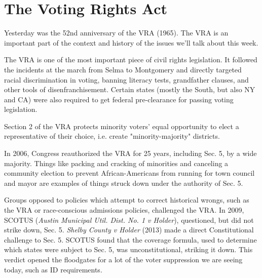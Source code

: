 



\section*{The Voting Rights Act}

Yesterday was the 52nd anniversary of the VRA (1965).  The VRA is an important part of the context and history of the issues we'll talk about this week.

The VRA is one of the most important piece of civil rights legislation.  It followed the incidents at the march from Selma to Montgomery and directly targeted racial discrimination in voting, banning literacy tests, grandfather clauses, and other tools of disenfranchisement.  Certain states (mostly the South, but also NY and CA) were also required to get federal pre-clearance for passing voting legislation.

Section 2 of the VRA protects minority voters' equal opportunity to elect a representative of their choice, i.e. create "minority-majority" districts.

In 2006, Congress reauthorized the VRA for 25 years, including Sec. 5, by a wide majority.  Things like packing and cracking of minorities and canceling a community election to prevent African-Americans from running for town council and mayor are examples of things struck down under the authority of Sec. 5.

Groups opposed to policies which attempt to correct historical wrongs, such as the VRA or race-conscious admissions policies, challenged the VRA.  In 2009, SCOTUS (\textit{Austin Municipal Util. Dist. No. 1 v Holder}), questioned, but did not strike down, Sec. 5.   \textit{Shelby County v Holder} (2013) made a direct Constitutional challenge to Sec. 5.  SCOTUS found that the coverage formula, used to determine which states were subject to Sec. 5, was unconstitutional, striking it down.  This verdict opened the floodgates for a lot of the voter suppression we are seeing today, such as ID requirements.  


